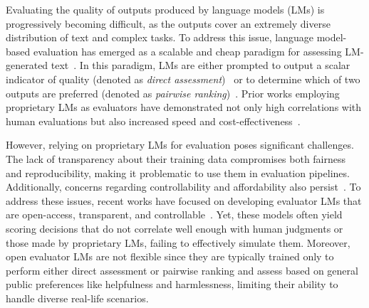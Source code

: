 \documentclass[11pt]{article}
\begin{document}
Evaluating the quality of outputs produced by language models (LMs) is progressively becoming difficult, as the outputs cover an extremely diverse distribution of text and complex tasks. To address this issue, language model-based evaluation has emerged as a scalable and cheap paradigm for assessing LM-generated text~\citep{li2024leveraging,gao2024llm}. In this paradigm, LMs are either prompted to output a scalar indicator of quality (denoted as \textit{direct assessment})~\citep{zheng2023judging,liu2023gpteval,ye2023flask,kim2023prometheus} or to determine which of two outputs are preferred (denoted as \textit{pairwise ranking})~\citep{wang2023pandalm,alpaca_eval,lambert2024rewardbench}. Prior works employing proprietary LMs as evaluators have demonstrated not only high correlations with human evaluations but also increased speed and cost-effectiveness~\citep{zheng2023judging, liu2023gpteval,  dubois2023alpacafarm, ye2023flask}.

However, relying on proprietary LMs for evaluation poses significant challenges. The lack of transparency about their training data compromises both fairness and reproducibility, making it problematic to use them in evaluation pipelines. Additionally, concerns regarding controllability and affordability also persist~\citep{kim2023prometheus}. To address these issues, recent works have focused on developing evaluator LMs that are open-access, transparent, and controllable~\citep{kim2023prometheus, wang2023math, wang2023pandalm, li2023generative, zhu2023judgelm, jiang2023tigerscore, jiang2023llm, lee2024prometheus}. Yet, these models often yield scoring decisions that do not correlate well enough with human judgments or those made by proprietary LMs, failing to effectively simulate them. Moreover, open evaluator LMs are not flexible since they are typically trained only to perform either direct assessment or pairwise ranking and assess based on general public preferences like helpfulness and harmlessness, limiting their ability to handle diverse real-life scenarios.

\end{document}
